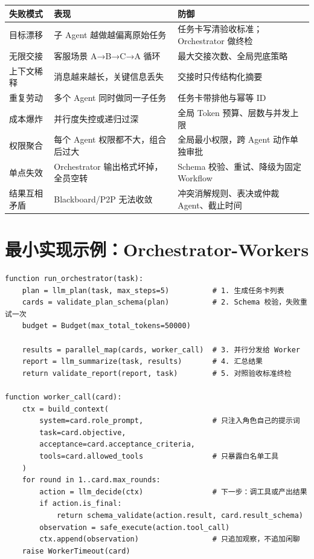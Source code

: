 \documentclass[9pt,a4paper,twocolumn]{ctexart}
\begin{document}
{\footnotesize
\begin{tabular}{|p{}|p{}|p{}|}
\hline
\textbf{失败模式} & \textbf{表现} & \textbf{防御} \\
\hline
目标漂移 & 子 Agent 越做越偏离原始任务 & 任务卡写清验收标准；Orchestrator 做终检 \\
\hline
无限交接 & 客服场景 A→B→C→A 循环 & 最大交接次数、全局兜底策略 \\
\hline
上下文稀释 & 消息越来越长，关键信息丢失 & 交接时只传结构化摘要 \\
\hline
重复劳动 & 多个 Agent 同时做同一子任务 & 任务卡带排他与幂等 ID \\
\hline
成本爆炸 & 并行度失控或递归过深 & 全局 Token 预算、层数与并发上限 \\
\hline
权限聚合 & 每个 Agent 权限都不大，组合后过大 & 全局最小权限，跨 Agent 动作单独审批 \\
\hline
单点失效 & Orchestrator 输出格式坏掉，全员空转 & Schema 校验、重试、降级为固定 Workflow \\
\hline
结果互相矛盾 & Blackboard/P2P 无法收敛 & 冲突消解规则、表决或仲裁 Agent、截止时间 \\
\hline
\end{tabular}
}



\section*{最小实现示例：Orchestrator-Workers}


\begin{lstlisting}
function run_orchestrator(task):
    plan = llm_plan(task, max_steps=5)          # 1. 生成任务卡列表
    cards = validate_plan_schema(plan)          # 2. Schema 校验，失败重试一次
    budget = Budget(max_total_tokens=50000)

    results = parallel_map(cards, worker_call)  # 3. 并行分发给 Worker
    report = llm_summarize(task, results)       # 4. 汇总结果
    return validate_report(report, task)        # 5. 对照验收标准终检

function worker_call(card):
    ctx = build_context(
        system=card.role_prompt,                # 只注入角色自己的提示词
        task=card.objective,
        acceptance=card.acceptance_criteria,
        tools=card.allowed_tools                # 只暴露白名单工具
    )
    for round in 1..card.max_rounds:
        action = llm_decide(ctx)                # 下一步：调工具或产出结果
        if action.is_final:
            return schema_validate(action.result, card.result_schema)
        observation = safe_execute(action.tool_call)
        ctx.append(observation)                 # 只追加观察，不追加闲聊
    raise WorkerTimeout(card)
\end{lstlisting}
\end{document}
